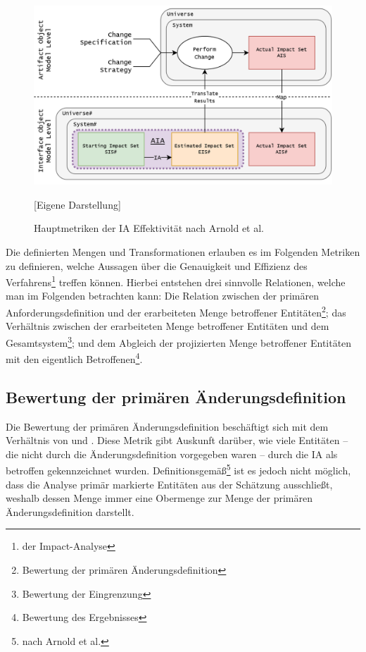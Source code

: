\begin{figure}[H]
    \centering
    \includegraphics[width=1\linewidth]{gfx/IA35.drawio.png}
    \caption{Hauptmetriken der \ac{IA} Effektivität nach Arnold et al. \cite[296]{app_bohner}}
    [Eigene Darstellung]
    \label{fig:aia}
\end{figure}

\pagebreak

\noindent
Die definierten Mengen und Transformationen erlauben es im Folgenden Metriken zu definieren, welche Aussagen über die Genauigkeit und Effizienz des Verfahrens\footnote{der Impact-Analyse} treffen können.
Hierbei entstehen drei sinnvolle Relationen, welche man im Folgenden betrachten kann:
Die Relation zwischen der primären Anforderungsdefinition und der erarbeiteten Menge betroffener Entitäten\footnote{Bewertung der primären Änderungsdefinition}; das Verhältnis zwischen der erarbeiteten Menge betroffener Entitäten und dem Gesamtsystem\footnote{Bewertung der Eingrenzung}; und dem Abgleich der projizierten Menge betroffener Entitäten mit den eigentlich Betroffenen\footnote{Bewertung des Ergebnisses}.


\subsection{Bewertung der primären Änderungsdefinition}

Die Bewertung der primären Änderungsdefinition beschäftigt sich mit dem Verhältnis von  und . 
Diese Metrik gibt Auskunft darüber, wie viele Entitäten -- die nicht durch die Änderungsdefinition vorgegeben waren -- durch die \ac{IA} als betroffen gekennzeichnet wurden.
Definitionsgemäß\footnote{nach Arnold et al.} ist es jedoch nicht möglich, dass die Analyse primär markierte Entitäten aus der Schätzung ausschließt, weshalb dessen Menge immer eine Obermenge zur Menge der primären Änderungsdefinition darstellt.


